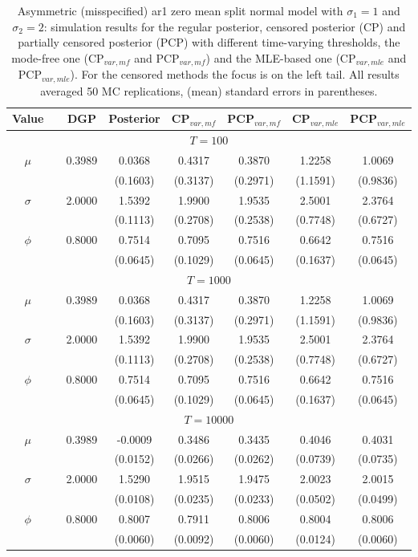{ \renewcommand{\arraystretch}{1.2} 
{\footnotesize 
\begin{table} 
\center 
\begin{tabular}{cc cccccc} 
Value && DGP & Posterior & CP$_{var,mf}$ & PCP$_{var,mf}$ & CP$_{var,mle}$ & PCP$_{var,mle }$\\ \hline 
\hline 
\multicolumn{8}{c}{$T =100$}  \\ 
\hline 
\rowcolor{LightCyan} 
$\mu$&& 0.3989 & 0.0368 & 0.4317 & 0.3870 & 1.2258 & 1.0069 \\ 
&&   & (0.1603) & (0.3137) & (0.2971) & (1.1591) & (0.9836) \\ [1ex]
\rowcolor{LightCyan} 
$\sigma$&& 2.0000 & 1.5392 & 1.9900 & 1.9535 & 2.5001 & 2.3764 \\ 
&&   & (0.1113) & (0.2708) & (0.2538) & (0.7748) & (0.6727) \\ [1ex]
\rowcolor{LightCyan} 
$\phi$&& 0.8000 & 0.7514 & 0.7095 & 0.7516 & 0.6642 & 0.7516 \\ 
&&   & (0.0645) & (0.1029) & (0.0645) & (0.1637) & (0.0645) \\ [1ex]
\hline 
\multicolumn{8}{c}{$T =1000$}  \\ 
\hline 
\rowcolor{LightCyan} 
$\mu$&& 0.3989 & 0.0368 & 0.4317 & 0.3870 & 1.2258 & 1.0069 \\ 
&&   & (0.1603) & (0.3137) & (0.2971) & (1.1591) & (0.9836) \\ [1ex]
\rowcolor{LightCyan} 
$\sigma$&& 2.0000 & 1.5392 & 1.9900 & 1.9535 & 2.5001 & 2.3764 \\ 
&&   & (0.1113) & (0.2708) & (0.2538) & (0.7748) & (0.6727) \\ [1ex]
\rowcolor{LightCyan} 
$\phi$&& 0.8000 & 0.7514 & 0.7095 & 0.7516 & 0.6642 & 0.7516 \\ 
&&   & (0.0645) & (0.1029) & (0.0645) & (0.1637) & (0.0645) \\ [1ex]
\hline 
\multicolumn{8}{c}{$T =10000$}  \\ 
\hline 
\rowcolor{LightCyan} 
$\mu$&& 0.3989 & -0.0009 & 0.3486 & 0.3435 & 0.4046 & 0.4031 \\ 
&&   & (0.0152) & (0.0266) & (0.0262) & (0.0739) & (0.0735) \\ [1ex]
\rowcolor{LightCyan} 
$\sigma$&& 2.0000 & 1.5290 & 1.9515 & 1.9475 & 2.0023 & 2.0015 \\ 
&&   & (0.0108) & (0.0235) & (0.0233) & (0.0502) & (0.0499) \\ [1ex]
\rowcolor{LightCyan} 
$\phi$&& 0.8000 & 0.8007 & 0.7911 & 0.8006 & 0.8004 & 0.8006 \\ 
&&   & (0.0060) & (0.0092) & (0.0060) & (0.0124) & (0.0060) \\ [1ex]
\hline 
\end{tabular}
 \caption{Asymmetric (misspecified) ar1 zero mean split normal model with $\sigma_{1} = 1$ and $\sigma_{2} = 2$:  simulation results for the regular posterior, censored posterior (CP)  and partially censored posterior (PCP) with different time-varying thresholds,  the mode-free one (CP$_{var,mf}$ and PCP$_{var,mf}$) and  the MLE-based one (CP$_{var,mle}$ and PCP$_{var,mle }$).  For the censored methods the focus is on the left tail.  All results averaged 50 MC replications, (mean) standard errors in parentheses.} 
\label{tab:ar1_s2_pcp_est_varc}  
\end{table}
}}